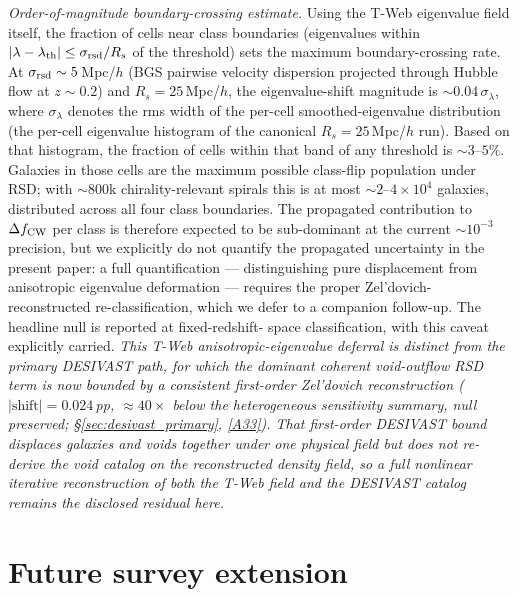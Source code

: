 \documentclass[twocolumn,linenumbers]{aastex702}
\newcommand{\repoBase}{https://github.com/Hubify-Projects/bigbounce/blob/main}
\begin{document}
\begin{itemize}
\emph{Order-of-magnitude boundary-crossing estimate.}
Using the T-Web eigenvalue field itself, the fraction of cells near
class boundaries (eigenvalues within $|\lambda - \lambda_{\rm th}|
\le \sigma_{\rm rsd}/R_s$ of the threshold) sets the maximum
boundary-crossing rate. At $\sigma_{\rm rsd} \sim 5$\,Mpc/$h$ (BGS
pairwise velocity dispersion projected through Hubble flow at
$z\!\sim\!0.2$) and $R_s\!=\!25$\,Mpc/$h$, the eigenvalue-shift
magnitude is $\sim 0.04\,\sigma_\lambda$, where $\sigma_\lambda$
denotes the rms width of the per-cell smoothed-eigenvalue
distribution (the per-cell eigenvalue histogram of the canonical
$R_s\!=\!25$\,Mpc/$h$ run). Based on that histogram,
the fraction of cells within that band of any threshold is
$\sim 3$--$5\%$. Galaxies in those cells are the maximum possible
class-flip population under RSD; with $\sim 800$k chirality-relevant
spirals this is at most $\sim 2$--$4\times 10^4$ galaxies, distributed
across all four class boundaries. The propagated contribution to
$\Delta f_{\rm CW}$ per class is therefore expected to be
sub-dominant at the current $\sim 10^{-3}$ precision, but we
explicitly do not quantify the propagated uncertainty in the
present paper:
a full quantification — distinguishing pure displacement from
anisotropic eigenvalue deformation — requires the proper
Zel'dovich-reconstructed re-classification, which we defer to a
companion follow-up. The headline null is reported at fixed-redshift-
space classification, with this caveat explicitly carried.
\emph{This T-Web anisotropic-eigenvalue deferral is distinct from the
\emph{primary} DESIVAST path, for which the dominant coherent
void-outflow RSD term is now bounded by a consistent first-order
Zel'dovich reconstruction ($|\text{shift}| = 0.024$\,pp, ${\approx}40\times$
below the heterogeneous sensitivity summary, null preserved;
\S\ref{sec:desivast_primary},
\href{\repoBase/pipelines/p5\_desi\_chirality/outputs/27\_rsd\_void\_recon\_bound.json}{[A33]}).
That first-order DESIVAST bound displaces galaxies and voids together
under one physical field but does not re-derive the void catalog on the
reconstructed density field, so a full nonlinear iterative
reconstruction of both the T-Web field and the DESIVAST catalog remains
the disclosed residual here.}
\fi
\end{itemize}

\section{Future survey extension}\label{sec:lsst}
\end{document}

